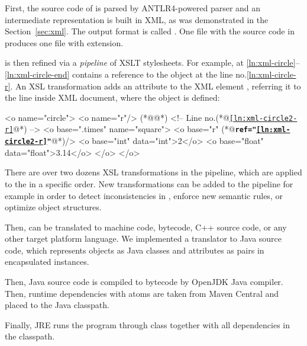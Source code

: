 First, the source code of \eolang{} is parsed by ANTLR4-powered
parser and an intermediate representation is built in XML,
as was demonstrated in the Section~\ref{sec:xml}.
The output format is called \xmir{}.
One  file with
the source code in \eolang{} produces one \xmir{} file with  extension.

\xmir{} is then refined via a \emph{pipeline} of XSLT stylesheets.
For example, \xmir{} at \ref{ln:xml-circle}--\ref{ln:xml-circle-end} contains a
reference to the object  at the line no.\ref{ln:xml-circle-r}.
An XSL transformation adds an attribute  to the XML element ,
referring it to the line inside XML document, where the object  is defined:

\begin{ffcode}
<o name="circle">
  <o name="r"/> (*@\label{ln:xml-circle2-r}@*) <!-- Line no.(*@\texttt{\ref{ln:xml-circle2-r}}@*) -->
  <o base=".times" name="square">
    <o base="r" (*@\textbf{\texttt{ref="\ref{ln:xml-circle2-r}"}}@*)/>
    <o base="int" data="int">2</o>
    <o base="float" data="float">3.14</o>
  </o>
</o>
\end{ffcode}

There are over two dozens XSL transformations in the pipeline, which
are applied to the \xmir{} in a specific order. New transformations can
be added to the pipeline for example in order to detect inconsistencies
in \xmir{}, enforce new semantic rules, or optimize object structures.

Then, \xmir{} can be translated to machine code, bytecode, C++ source code,
or any other target platform language. We implemented
a translator to Java source code, which represents
\xmir{} objects as Java classes and attributes as pairs in encapsulated
 instances.

Then, Java source code is compiled to bytecode by OpenJDK Java compiler.
Then, runtime dependencies with atoms are taken from Maven Central
and placed to the Java classpath.

Finally, JRE runs the program through  class together with
all  dependencies in the classpath.

